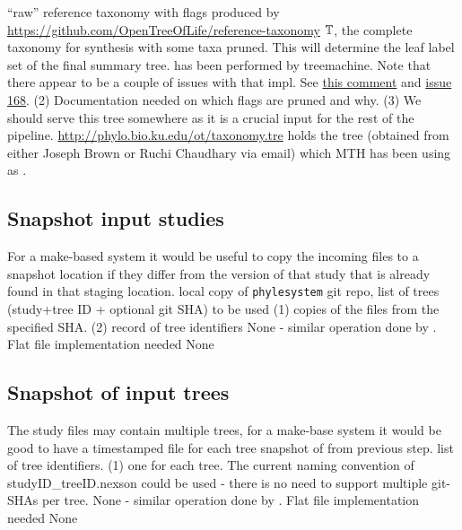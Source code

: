 \documentclass[11pt]{article}
\begin{document}
\stepInput ``raw'' reference taxonomy with flags produced by \url{https://github.com/OpenTreeOfLife/reference-taxonomy}
\stepOutput $\mathbb{T}$, the complete taxonomy for synthesis with some taxa pruned.
This will determine the leaf label set of the final summary tree.
\currImpl has been performed by treemachine. Note that there appear to be
    a couple of issues with that impl. See 
\href{https://github.com/OpenTreeOfLife/treemachine/commit/48211803f137ad0b7c096c28d1c10d32f671194f}{this comment} and
\href{https://github.com/OpenTreeOfLife/treemachine/issues/168}{issue 168}.
(2) Documentation needed on which flags are pruned and why.
(3) We should serve this tree somewhere as it is a crucial input for the rest of the pipeline.
\currURL {} \url{http://phylo.bio.ku.edu/ot/taxonomy.tre} holds the tree (obtained
    from either Joseph Brown or Ruchi Chaudhary via email) which MTH has been using as \taxonomy.

\subsection{Snapshot input studies}
\stepExplanation For a make-based system it would be useful to copy the incoming \nexson files
    to a snapshot location if they differ from the version of that study that is already found
    in that staging location.
\stepInput local copy of \texttt{phylesystem} git repo, list of trees (study+tree ID + optional git SHA) to be used
\stepOutput (1) copies of the \nexson files from the specified SHA. (2) record of tree identifiers
\currImpl None - similar operation done by \gcmdr.
\implTODO Flat file implementation needed
\currURL None
 
\subsection{Snapshot of input trees}
\stepExplanation The study files may contain multiple trees, for a make-base system it would
    be good to have a timestamped file for each tree
\stepInput snapshot of \nexson from previous step. list of tree identifiers.
\stepOutput (1) one \nexson for each tree. The current naming convention of studyID\_treeID.nexson could
    be used - there is no need to support multiple git-SHAs per tree.
\currImpl None - similar operation done by \gcmdr.
\implTODO Flat file implementation needed
\currURL None
 
\end{document}
